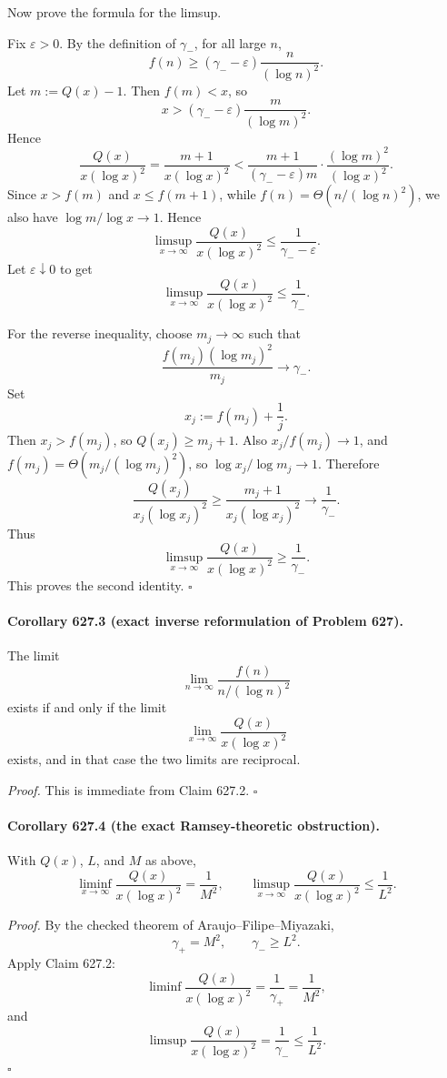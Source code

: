 Now prove the formula for the limsup.

Fix \(\varepsilon>0\). By the definition of \(\gamma_-\), for all large \(n\),
\[
f(n)\ge (\gamma_--\varepsilon)\frac{n}{(\log n)^2}.
\]
Let \(m:=Q(x)-1\). Then \(f(m)<x\), so
\[
x> (\gamma_--\varepsilon)\frac{m}{(\log m)^2}.
\]
Hence
\[
\frac{Q(x)}{x(\log x)^2}
=
\frac{m+1}{x(\log x)^2}
<
\frac{m+1}{(\gamma_--\varepsilon)m}\cdot \frac{(\log m)^2}{(\log x)^2}.
\]
Since \(x>f(m)\) and \(x\le f(m+1)\), while \(f(n)=\Theta(n/(\log n)^2)\), we also have \(\log m/\log x\to 1\). Hence
\[
\limsup_{x\to\infty}\frac{Q(x)}{x(\log x)^2}\le \frac{1}{\gamma_--\varepsilon}.
\]
Let \(\varepsilon\downarrow 0\) to get
\[
\limsup_{x\to\infty}\frac{Q(x)}{x(\log x)^2}\le \frac{1}{\gamma_-}.
\]

For the reverse inequality, choose \(m_j\to\infty\) such that
\[
\frac{f(m_j)(\log m_j)^2}{m_j}\to \gamma_-.
\]
Set
\[
x_j:=f(m_j)+\frac{1}{j}.
\]
Then \(x_j>f(m_j)\), so \(Q(x_j)\ge m_j+1\). Also \(x_j/f(m_j)\to 1\), and \(f(m_j)=\Theta(m_j/(\log m_j)^2)\), so \(\log x_j/\log m_j\to 1\). Therefore
\[
\frac{Q(x_j)}{x_j(\log x_j)^2}
\ge
\frac{m_j+1}{x_j(\log x_j)^2}
\to
\frac{1}{\gamma_-}.
\]
Thus
\[
\limsup_{x\to\infty}\frac{Q(x)}{x(\log x)^2}\ge \frac{1}{\gamma_-}.
\]
This proves the second identity. \(\square\)

\paragraph{Corollary 627.3 (exact inverse reformulation of Problem 627).}
The limit
\[
\lim_{n\to\infty}\frac{f(n)}{n/(\log n)^2}
\]
exists if and only if the limit
\[
\lim_{x\to\infty}\frac{Q(x)}{x(\log x)^2}
\]
exists, and in that case the two limits are reciprocal.

\emph{Proof.}
This is immediate from Claim 627.2. \(\square\)

\paragraph{Corollary 627.4 (the exact Ramsey-theoretic obstruction).}
With \(Q(x)\), \(L\), and \(M\) as above,
\[
\liminf_{x\to\infty}\frac{Q(x)}{x(\log x)^2}=\frac{1}{M^2},
\qquad
\limsup_{x\to\infty}\frac{Q(x)}{x(\log x)^2}\le \frac{1}{L^2}.
\]

\emph{Proof.}
By the checked theorem of Araujo--Filipe--Miyazaki,
\[
\gamma_+=M^2,\qquad \gamma_-\ge L^2.
\]
Apply Claim 627.2:
\[
\liminf \frac{Q(x)}{x(\log x)^2}=\frac{1}{\gamma_+}=\frac{1}{M^2},
\]
and
\[
\limsup \frac{Q(x)}{x(\log x)^2}=\frac{1}{\gamma_-}\le \frac{1}{L^2}.
\]
\(\square\)

